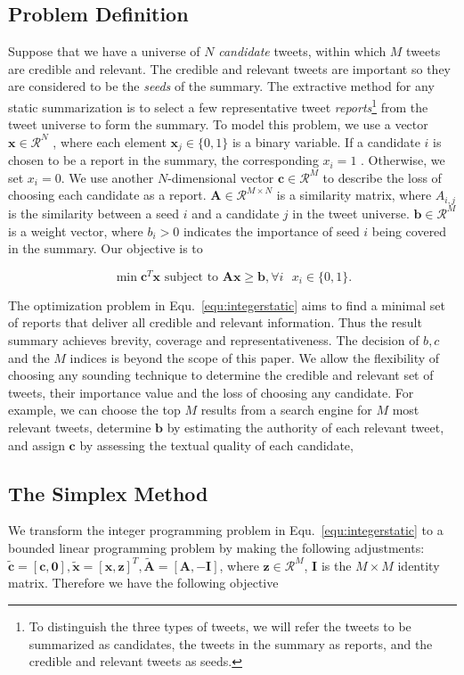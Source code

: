 \documentclass{llncs}
\begin{document}
\subsection{Problem Definition}
Suppose that we have a universe of $N$ \emph{candidate} tweets, within which $M$ tweets are credible and relevant. The credible and relevant tweets are important so they are considered to be the \emph{seeds} of the summary. The extractive method for any static summarization is to select a few representative tweet \emph{reports}\footnote{To distinguish the three types of tweets, we will refer the tweets to be summarized as candidates, the tweets in the summary as reports, and the credible and relevant tweets as seeds.} from the tweet universe to form the summary. To model this problem, we use a vector $\mathbf{x}\in \mathcal{R}^N$ , where each element $\mathbf{x}_j\in \{0,1\}$ is a binary variable. If a candidate  $i$ is chosen to be a report in the summary, the corresponding $x_i=1$ . Otherwise, we set  $x_i=0$. We use another $N$-dimensional vector $\mathbf{c}\in \mathcal{R}^M$ to describe the loss of choosing each candidate as a report. $\mathbf{A}\in\mathcal{R}^{M\times N}$  is a similarity matrix, where $A_{i,j}$  is the similarity between a seed $i$ and a candidate $j$ in the tweet universe. $\mathbf{b}\in \mathcal{R}^{M}$ is a weight vector, where $b_{i}>0$ indicates the importance of seed $i$ being covered in the summary. Our objective is to

\begin{equation}\label{equ:integerstatic}
\min \mathbf{c}^T \mathbf{x} \textrm{ subject to } \mathbf{A} \mathbf{x} \geq \mathbf{b}, \forall i\textrm{ } x_i\in \{0,1\}.
\end{equation}

The optimization problem in Equ.~\ref{equ:integerstatic} aims to find a minimal set of reports that deliver all credible and relevant information. Thus the result summary achieves brevity, coverage and representativeness. The decision of $b,c$ and the $M$ indices is beyond the scope of this paper. We allow the flexibility of choosing any sounding technique to determine the credible and relevant set of tweets, their importance value and the loss of choosing any candidate. For example,  we can choose the top $M$ results from a search engine for $M$ most relevant tweets, determine $\mathbf{b}$  by estimating  the authority of each relevant tweet, and assign $\mathbf{c}$ by assessing the textual quality of each candidate,  

\subsection{The Simplex Method}
We transform the integer programming problem in Equ.~\ref{equ:integerstatic} to a bounded linear programming problem by making the following adjustments: $\tilde{\mathbf{c}}=[\mathbf{c},\mathbf{0}],\tilde{\mathbf{x}}=[\mathbf{x},\mathbf{z}]^T,\tilde{\mathbf{A}}=[\mathbf{A},-\mathbf{I}]$, where $\mathbf{z}\in\mathcal{R}^M$, $ \mathbf{I}$ is the $M\times M$ identity matrix. Therefore we have the following objective
\end{document}
